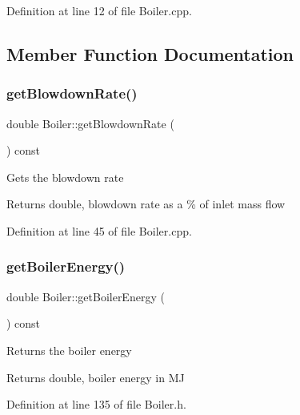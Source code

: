 Definition at line 12 of file Boiler.\+cpp.



\subsection{Member Function Documentation}
\mbox{\label{class_boiler_aec9bf6eeed82d8d5f35284c65a3986e7}} 
\subsubsection{\texorpdfstring{get\+Blowdown\+Rate()}{getBlowdownRate()}}
{\footnotesize\ttfamily double Boiler\+::get\+Blowdown\+Rate (\begin{DoxyParamCaption}{ }\end{DoxyParamCaption}) const}

Gets the blowdown rate \begin{DoxyReturn}{Returns}
double, blowdown rate as a \% of inlet mass flow 
\end{DoxyReturn}


Definition at line 45 of file Boiler.\+cpp.

\mbox{\label{class_boiler_a8cc9ad5f1b36f5dcbcb225e9e3d13a39}} 
\subsubsection{\texorpdfstring{get\+Boiler\+Energy()}{getBoilerEnergy()}}
{\footnotesize\ttfamily double Boiler\+::get\+Boiler\+Energy (\begin{DoxyParamCaption}{ }\end{DoxyParamCaption}) const\hspace{0.3cm}{\ttfamily [inline]}}

Returns the boiler energy \begin{DoxyReturn}{Returns}
double, boiler energy in MJ 
\end{DoxyReturn}


Definition at line 135 of file Boiler.\+h.

\mbox{\label{class_boiler_a21c7423b756761c3216704b3f554feff}} 
